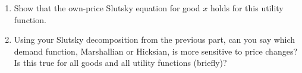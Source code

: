 \documentclass[11pt]{article}
\begin{document}
\begin{enumerate}
    \item Show that the own-price Slutsky equation for good $x$ holds for this utility function.
        \item Using your Slutsky decomposition from the previous part, can you say which demand function, Marshallian or Hicksian, is more sensitive to price changes? Is this true for all goods and all utility functions (briefly)?

\end{enumerate}
\end{document}
